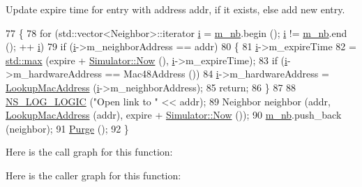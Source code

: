 Update expire time for entry with address addr, if it exists, else add new entry. 


\begin{DoxyCode}
77 \{
78   \textcolor{keywordflow}{for} (std::vector<Neighbor>::iterator \hyperlink{bernuolliDistribution_8m_a6f6ccfcf58b31cb6412107d9d5281426}{i} = \hyperlink{classns3_1_1aodv_1_1Neighbors_a885bb3a178f3583ed73e391d918f2f63}{m\_nb}.begin (); \hyperlink{bernuolliDistribution_8m_a6f6ccfcf58b31cb6412107d9d5281426}{i} != \hyperlink{classns3_1_1aodv_1_1Neighbors_a885bb3a178f3583ed73e391d918f2f63}{m\_nb}.end (); ++
      \hyperlink{bernuolliDistribution_8m_a6f6ccfcf58b31cb6412107d9d5281426}{i})
79     \textcolor{keywordflow}{if} (\hyperlink{bernuolliDistribution_8m_a6f6ccfcf58b31cb6412107d9d5281426}{i}->m\_neighborAddress == addr)
80       \{
81         \hyperlink{bernuolliDistribution_8m_a6f6ccfcf58b31cb6412107d9d5281426}{i}->m\_expireTime
82           = \hyperlink{80211b_8c_affe776513b24d84b39af8ab0930fef7f}{std::max} (expire + \hyperlink{classns3_1_1Simulator_ac3178fa975b419f7875e7105be122800}{Simulator::Now} (), \hyperlink{bernuolliDistribution_8m_a6f6ccfcf58b31cb6412107d9d5281426}{i}->m\_expireTime);
83         \textcolor{keywordflow}{if} (\hyperlink{bernuolliDistribution_8m_a6f6ccfcf58b31cb6412107d9d5281426}{i}->m\_hardwareAddress == Mac48Address ())
84           \hyperlink{bernuolliDistribution_8m_a6f6ccfcf58b31cb6412107d9d5281426}{i}->m\_hardwareAddress = \hyperlink{classns3_1_1aodv_1_1Neighbors_a0cbe6baaf85a2f8664806dc56f782c63}{LookupMacAddress} (\hyperlink{bernuolliDistribution_8m_a6f6ccfcf58b31cb6412107d9d5281426}{i}->m\_neighborAddress);
85         \textcolor{keywordflow}{return};
86       \}
87 
88   \hyperlink{group__logging_ga88acd260151caf2db9c0fc84997f45ce}{NS\_LOG\_LOGIC} (\textcolor{stringliteral}{"Open link to "} << addr);
89   Neighbor neighbor (addr, \hyperlink{classns3_1_1aodv_1_1Neighbors_a0cbe6baaf85a2f8664806dc56f782c63}{LookupMacAddress} (addr), expire + 
      \hyperlink{classns3_1_1Simulator_ac3178fa975b419f7875e7105be122800}{Simulator::Now} ());
90   \hyperlink{classns3_1_1aodv_1_1Neighbors_a885bb3a178f3583ed73e391d918f2f63}{m\_nb}.push\_back (neighbor);
91   \hyperlink{classns3_1_1aodv_1_1Neighbors_a5db1238b20a700967e21ebb3522afc5c}{Purge} ();
92 \}
\end{DoxyCode}


Here is the call graph for this function\+:




Here is the caller graph for this function\+:





